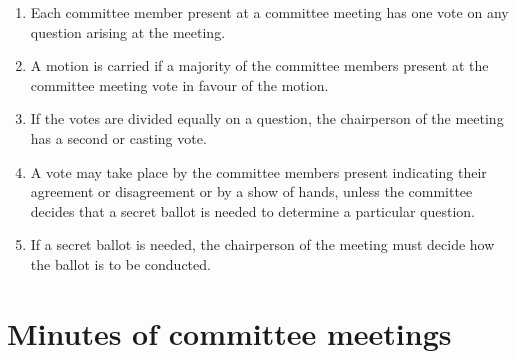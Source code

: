 \begin{enumerate}

\item Each committee member present at a committee meeting has one vote on any question arising at the meeting.
\item A motion is carried if a majority of the committee members present at the committee meeting vote in favour of the motion.
\item If the votes are divided equally on a question, the chairperson of the meeting has a second or casting vote.
\item A vote may take place by the committee members present indicating their agreement or disagreement or by a show of hands, unless the committee decides that a secret ballot is needed to determine a particular question.
\item If a secret ballot is needed, the chairperson of the meeting must decide how the ballot is to be conducted.
\end{enumerate}

\hypertarget{minutes-of-committee-meetings}{%
\section{Minutes of committee meetings}\label{minutes-of-committee-meetings}}

